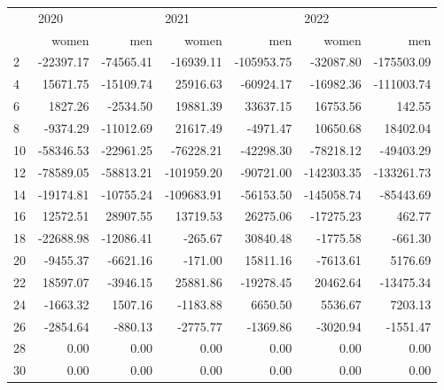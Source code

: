 \begin{tabular}{lrrrrrr}
\toprule
{} & \multicolumn{2}{l}{2020} & \multicolumn{2}{l}{2021} & \multicolumn{2}{l}{2022} \\
{} &     women &       men &      women &        men &      women &        men \\
\midrule
2  & -22397.17 & -74565.41 &  -16939.11 & -105953.75 &  -32087.80 & -175503.09 \\
4  &  15671.75 & -15109.74 &   25916.63 &  -60924.17 &  -16982.36 & -111003.74 \\
6  &   1827.26 &  -2534.50 &   19881.39 &   33637.15 &   16753.56 &     142.55 \\
8  &  -9374.29 & -11012.69 &   21617.49 &   -4971.47 &   10650.68 &   18402.04 \\
10 & -58346.53 & -22961.25 &  -76228.21 &  -42298.30 &  -78218.12 &  -49403.29 \\
12 & -78589.05 & -58813.21 & -101959.20 &  -90721.00 & -142303.35 & -133261.73 \\
14 & -19174.81 & -10755.24 & -109683.91 &  -56153.50 & -145058.74 &  -85443.69 \\
16 &  12572.51 &  28907.55 &   13719.53 &   26275.06 &  -17275.23 &     462.77 \\
18 & -22688.98 & -12086.41 &    -265.67 &   30840.48 &   -1775.58 &    -661.30 \\
20 &  -9455.37 &  -6621.16 &    -171.00 &   15811.16 &   -7613.61 &    5176.69 \\
22 &  18597.07 &  -3946.15 &   25881.86 &  -19278.45 &   20462.64 &  -13475.34 \\
24 &  -1663.32 &   1507.16 &   -1183.88 &    6650.50 &    5536.67 &    7203.13 \\
26 &  -2854.64 &   -880.13 &   -2775.77 &   -1369.86 &   -3020.94 &   -1551.47 \\
28 &      0.00 &      0.00 &       0.00 &       0.00 &       0.00 &       0.00 \\
30 &      0.00 &      0.00 &       0.00 &       0.00 &       0.00 &       0.00 \\
\bottomrule
\end{tabular}
